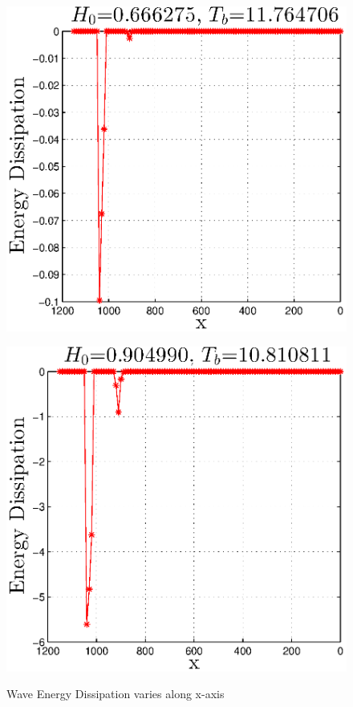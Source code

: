 \begin{figure}[h]
\begin{minipage}[b]{0.47\linewidth}
\centering
\includegraphics[width=\textwidth]{forward_plot/p1_7.eps}
\label{FigE_1}
\end{minipage}
\hspace{0.4cm}
\begin{minipage}[b]{0.47\linewidth}
\centering
\includegraphics[width=\textwidth]{forward_plot/p2_7.eps}
\label{FigE_2}
\end{minipage}
\caption{Wave Energy Dissipation varies along x-axis}
\end{figure}

